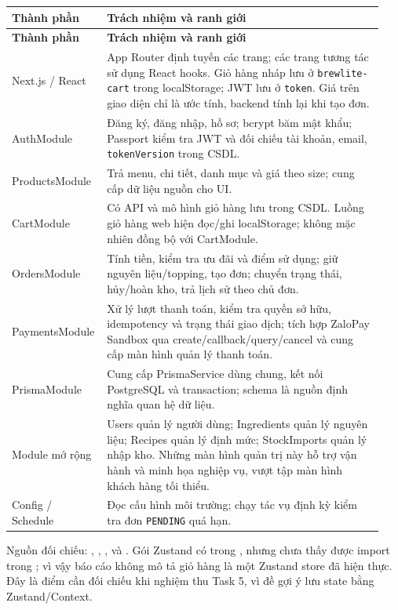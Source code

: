 \begin{longtable}{@{}p{0.21\linewidth}p{0.73\linewidth}@{}}
\toprule
\textbf{Thành phần} & \textbf{Trách nhiệm và ranh giới} \\
\midrule
\endfirsthead
\toprule
\textbf{Thành phần} & \textbf{Trách nhiệm và ranh giới} \\
\midrule
\endhead
Next.js / React & App Router định tuyến các trang; các trang tương tác sử dụng React hooks. Giỏ hàng nháp lưu ở \texttt{brewlite-cart} trong localStorage; JWT lưu ở \texttt{token}. Giá trên giao diện chỉ là ước tính, backend tính lại khi tạo đơn. \\
AuthModule & Đăng ký, đăng nhập, hồ sơ; bcrypt băm mật khẩu; Passport kiểm tra JWT và đối chiếu tài khoản, email, \texttt{tokenVersion} trong CSDL. \\
ProductsModule & Trả menu, chi tiết, danh mục và giá theo size; cung cấp dữ liệu nguồn cho UI. \\
CartModule & Có API và mô hình giỏ hàng lưu trong CSDL. Luồng giỏ hàng web hiện đọc/ghi localStorage; không mặc nhiên đồng bộ với CartModule. \\
OrdersModule & Tính tiền, kiểm tra ưu đãi và điểm sử dụng; giữ nguyên liệu/topping, tạo đơn; chuyển trạng thái, hủy/hoàn kho, trả lịch sử theo chủ đơn. \\
PaymentsModule & Xử lý lượt thanh toán, kiểm tra quyền sở hữu, idempotency và trạng thái giao dịch; tích hợp ZaloPay Sandbox qua create/callback/query/cancel và cung cấp màn hình quản lý thanh toán. \\
PrismaModule & Cung cấp PrismaService dùng chung, kết nối PostgreSQL và transaction; schema là nguồn định nghĩa quan hệ dữ liệu. \\
Module mở rộng & Users quản lý người dùng; Ingredients quản lý nguyên liệu; Recipes quản lý định mức; StockImports quản lý nhập kho. Những màn hình quản trị này hỗ trợ vận hành và minh họa nghiệp vụ, vượt tập màn hình khách hàng tối thiểu. \\
Config / Schedule & Đọc cấu hình môi trường; chạy tác vụ định kỳ kiểm tra đơn \texttt{PENDING} quá hạn. \\
\bottomrule
\end{longtable}

Nguồn đối chiếu: , , ,  và . Gói Zustand có trong , nhưng chưa thấy được import trong ; vì vậy báo cáo không mô tả giỏ hàng là một Zustand store đã hiện thực. Đây là điểm cần đối chiếu khi nghiệm thu Task 5, vì đề gợi ý lưu state bằng Zustand/Context.

